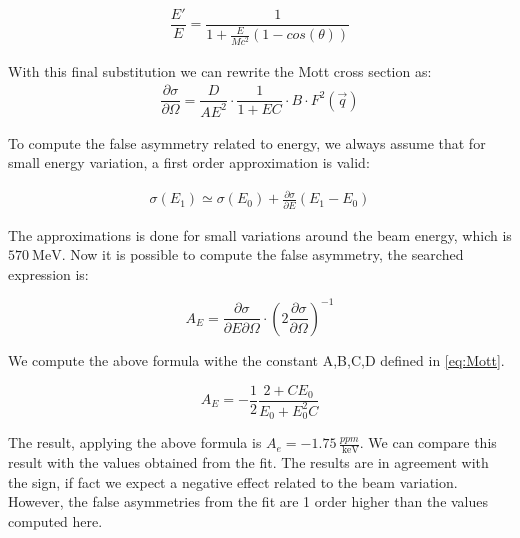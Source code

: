 \begin{align*}
\dfrac{E'}{E} = \dfrac{1}{1 + \frac{E}{Mc^{2}} (1 - cos(\theta))}
\end{align*}

With this final substitution we can rewrite the Mott cross section as:
\begin{align*}
\dfrac{\partial \sigma}{\partial \Omega} = \dfrac{D}{AE^{2}} \cdot \dfrac{1}{1 + EC} \cdot B \cdot F^{2}(\vec{q})
\end{align*}
 
To compute the false asymmetry related to energy, we always assume that for small energy variation, a first order approximation is valid:

\begin{align*}
\sigma (E_{1}) \simeq \sigma(E_{0}) + \frac{\partial \sigma}{\partial E} (E_{1} - E_{0})
\end{align*}

The approximations is done for small variations around the beam energy, which is $\SI{570}{\mega \electronvolt}$.
Now it is possible to compute the false asymmetry, the searched expression is:

\begin{equation}
A_{E} = \dfrac{\partial \sigma}{\partial E \partial \Omega} \cdot  (2 \dfrac{\partial \sigma}{\partial \Omega})^{-1}
\end{equation}

We compute the above formula withe the constant A,B,C,D defined in \ref{eq:Mott}.

\begin{equation}
A_{E} = - \frac{1}{2} \dfrac{2 + CE_{0}}{E_{0} + E_{0}^{2}C} 
\end{equation}

The result, applying the above formula is $A_{e} = -1.75 \, \frac{ppm}{\SI{}{\kilo \electronvolt}}$. We can compare this result with the values obtained from the fit. The results are in agreement with the sign, if fact we expect a negative effect related to the beam variation. However, the false asymmetries from the fit are 1 order higher than the values computed here.






